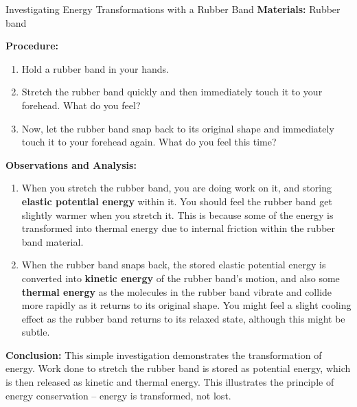 \begin{investigation}{Investigating Energy Transformations with a Rubber Band}
\textbf{Materials:} Rubber band

\textbf{Procedure:}
\begin{enumerate}
    \item Hold a rubber band in your hands.
    \item Stretch the rubber band quickly and then immediately touch it to your forehead. What do you feel?
    \item Now, let the rubber band snap back to its original shape and immediately touch it to your forehead again. What do you feel this time?
\end{enumerate}

\textbf{Observations and Analysis:}
\begin{enumerate}
    \item When you stretch the rubber band, you are doing work on it, and storing \textbf{elastic potential energy} within it. You should feel the rubber band get slightly warmer when you stretch it. This is because some of the energy is transformed into thermal energy due to internal friction within the rubber band material.
    \item When the rubber band snaps back, the stored elastic potential energy is converted into \textbf{kinetic energy} of the rubber band's motion, and also some \textbf{thermal energy} as the molecules in the rubber band vibrate and collide more rapidly as it returns to its original shape. You might feel a slight cooling effect as the rubber band returns to its relaxed state, although this might be subtle.
\end{enumerate}

\textbf{Conclusion:}
This simple investigation demonstrates the transformation of energy.  Work done to stretch the rubber band is stored as potential energy, which is then released as kinetic and thermal energy.  This illustrates the principle of energy conservation – energy is transformed, not lost.
\end{investigation}

